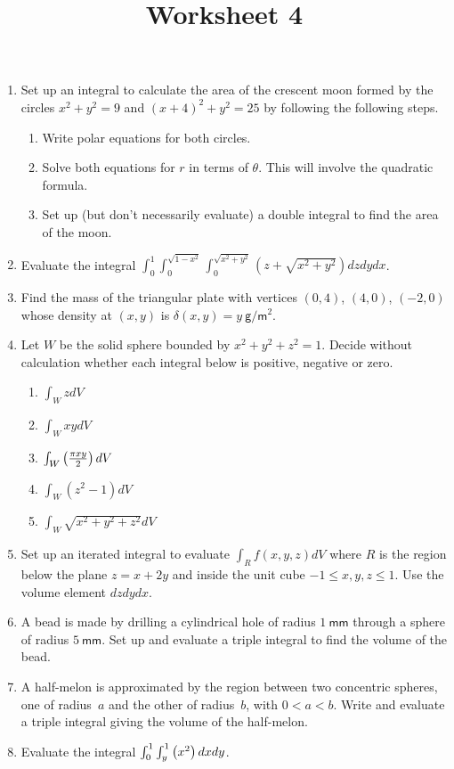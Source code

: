 \documentclass[12pt]{article}
\title{Worksheet 4}
\author{}\date{}
\let\sin\relax\DeclareMathOperator{\sin}{\mathsf{sin}}
\begin{document}
\maketitle
\thispagestyle{empty}

\begin{enumerate}
\item Set up an integral to calculate
the area of the crescent moon formed by
the circles $x^2+y^2=9$ and $\left(x+4\right)^2+y^2=25$
by following the following steps.
\begin{enumerate}
\item Write polar equations for both circles.
\item Solve both equations for $r$ in terms of $\theta$. This
will involve the quadratic formula.
\item Set up (but don't necessarily evaluate)
a double integral to find the area
of the moon.
\end{enumerate}

\item Evaluate the integral
$\int_0^1\int_0^{\sqrt{1-x^2}}\int_0^{\sqrt{x^2+y^2}}
\left(z+\sqrt{x^2+y^2}\right)dzdydx$.

\item Find the mass of the triangular plate with vertices
$\left(0,4\right)$, $\left(4,0\right)$, $\left(-2,0\right)$
whose density at $\left(x,y\right)$ is $\delta\left(x,y\right)
=y~\mathsf{g}/\mathsf{m}^2$.

\item Let $W$ be the solid sphere bounded by $x^2+y^2+z^2=1$.
Decide without calculation whether each integral below
is positive, negative or zero.
\begin{enumerate}
\item $\int_WzdV$
\item $\int_WxydV$
\item $\int_W\sin\left(\frac{\pi xy}{2}\right)dV$
\item $\int_W\left(z^2-1\right)dV$
\item $\int_W\sqrt{x^2+y^2+z^2}dV$
\end{enumerate}

\item Set up an iterated integral to evaluate
$\int_Rf\left(x,y,z\right)dV$ where $R$ is
the region below the plane $z=x+2y$ and inside
the unit cube $-1\le x,y,z\le 1$. Use the volume
element $dzdydx$.

\item A bead is made by drilling a cylindrical
hole of radius $1~\mathsf{mm}$ through a sphere
of radius $5~\mathsf{mm}$. Set up and evaluate
a triple integral to find the volume of the bead.

\item A half-melon is approximated by the region
between two concentric spheres, one of radius~$a$
and the other of radius~$b$, with $0<a<b$. Write
and evaluate a triple integral giving the volume
of the half-melon.

\item Evaluate the integral
$\int_0^1\int_y^1\sin\left(x^2\right)dxdy$.

\end{enumerate}
\end{document}
